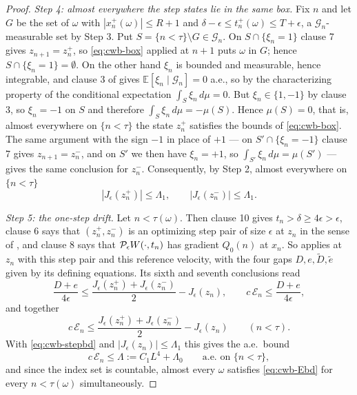 \begin{proof}
\emph{Step 4: almost everywhere the step states lie in the same box.}
Fix $n$ and let $G$ be the set of $\omega$ with
$|x^+_n(\omega)|\le R+1$ and $\delta-\epsilon\le t^+_n(\omega)\le T+\epsilon$,
a $\mathcal G_n$-measurable set by Step 3. Put
$S=\{n<\tau\}\setminus G\in\mathcal G_n$. On $S\cap\{\xi_n=1\}$ clause 7 gives
$z_{n+1}=z^+_n$, so \eqref{eq:cwb-box} applied at $n+1$ puts $\omega$ in $G$;
hence $S\cap\{\xi_n=1\}=\emptyset$. On the other hand $\xi_n$ is bounded and
measurable, hence integrable, and clause 3 of  gives
$\mathbb E[\xi_n\mid\mathcal G_n]=0$ a.e., so by the characterizing property of
the conditional expectation $\int_S\xi_n\,d\mu=0$. But $\xi_n\in\{1,-1\}$ by
clause 3, so $\xi_n=-1$ on $S$ and therefore
$\int_S\xi_n\,d\mu=-\mu(S)$. Hence $\mu(S)=0$, that is, almost everywhere on
$\{n<\tau\}$ the state $z^+_n$ satisfies the bounds of \eqref{eq:cwb-box}. The
same argument with the sign $-1$ in place of $+1$ --- on
$S'\cap\{\xi_n=-1\}$ clause 7 gives $z_{n+1}=z^-_n$, and on $S'$ we then have
$\xi_n=+1$, so $\int_{S'}\xi_n\,d\mu=\mu(S')$ --- gives the same conclusion for
$z^-_n$. Consequently, by Step 2, almost everywhere on $\{n<\tau\}$
\begin{equation}\label{eq:cwb-stepbd}
  |J_\epsilon(z^+_n)|\le\Lambda_1,\qquad |J_\epsilon(z^-_n)|\le\Lambda_1 .
\end{equation}

\emph{Step 5: the one-step drift.}
Let $n<\tau(\omega)$. Then clause 10 gives $t_n>\delta\ge4\epsilon>\epsilon$,
clause 6 says that $(z^+_n,z^-_n)$ is an optimizing step pair of size $\epsilon$
at $z_n$ in the sense of , and clause 8 says that
$\mathcal{P}_\epsilon W(\cdot,t_n)$ has gradient $Q_0(n)$ at $x_n$. So
 applies at $z_n$ with this step pair and this reference
velocity, with the four gaps $D,e,\tilde D,\tilde e$ given by its defining
equations. Its sixth and seventh conclusions read
\[
  \frac{D+e}{4\epsilon}
   \le\frac{J_\epsilon(z^+_n)+J_\epsilon(z^-_n)}{2}-J_\epsilon(z_n),
  \qquad
  c\,\mathcal E_n\le\frac{D+e}{4\epsilon},
\]
and together
\begin{equation}\label{eq:cwb-drift}
  c\,\mathcal E_n
   \le\frac{J_\epsilon(z^+_n)+J_\epsilon(z^-_n)}{2}-J_\epsilon(z_n)
  \qquad(n<\tau).
\end{equation}
With \eqref{eq:cwb-stepbd} and $|J_\epsilon(z_n)|\le\Lambda_1$ this gives the
a.e.\ bound
\begin{equation}\label{eq:cwb-Ebd}
  c\,\mathcal E_n\le\Lambda:=C_1L^4+\Lambda_0
  \qquad\text{a.e.\ on }\{n<\tau\} ,
\end{equation}
and since the index set is countable, almost every $\omega$ satisfies
\eqref{eq:cwb-Ebd} for every $n<\tau(\omega)$ simultaneously.


\end{proof}
